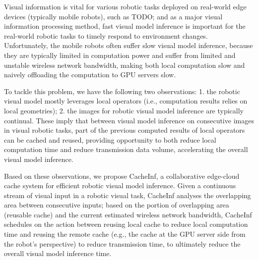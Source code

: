 Visual information is vital for various robotic tasks deployed on real-world edge devices (typically mobile robots), such as TODO;
and as a major visual information processing method, fast visual model inference is important for the real-world robotic tasks to timely respond to environment changes. 
Unfortunately, the mobile robots often suffer slow visual model inference, because they are typically limited in computation power and suffer from limited and unstable wireless network bandwidth, making both local computation slow and naively offloading the computation to GPU servers slow.


To tackle this problem, we have the following two observations:
1. the robotic visual model mostly leverages local operators (i.e., computation results relies on local geometries); 
2. the images for robotic visual model inference are typically continual.
These imply that between visual model inference on consecutive images in visual robotic tasks, part of the previous computed results of local operators can be cached and reused, providing opportunity to both reduce local computation time and reduce transmission data volume, accelerating the overall visual model inference.


Based on these observations, we propose CacheInf, a collaborative edge-cloud cache system for efficient robotic visual model inference.
Given a continuous stream of visual input in a robotic visual task, CacheInf analyses the overlapping area between consecutive inputs;
based on the portion of overlapping area (reusable cache) and the current estimated wireless network bandwidth, CacheInf schedules on the action between reusing local cache to reduce local computation time and reusing the remote cache (e.g., the cache at the GPU server side from the robot's perspective) to reduce transmission time, to ultimately reduce the overall visual model inference time.

